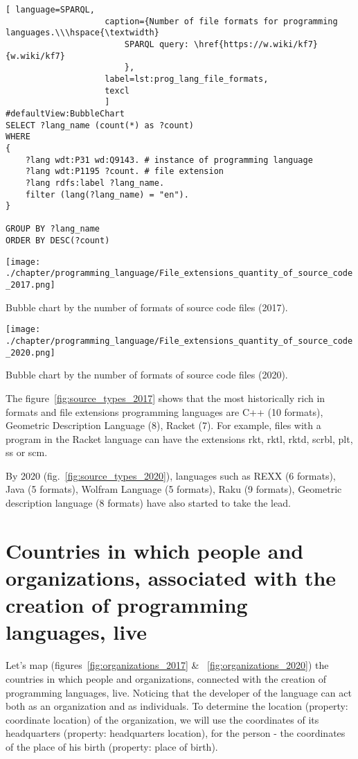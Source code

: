 \begin{lstlisting}[ language=SPARQL, 
                    caption={Number of file formats for programming languages.\\\hspace{\textwidth}
                        SPARQL query: \href{https://w.wiki/kf7}{w.wiki/kf7}
                        },
                    label=lst:prog_lang_file_formats,
                    texcl 
                    ]
#defaultView:BubbleChart
SELECT ?lang_name (count(*) as ?count)
WHERE
{
    ?lang wdt:P31 wd:Q9143. # instance of programming language
  	?lang wdt:P1195 ?count. # file extension
  	?lang rdfs:label ?lang_name.
    filter (lang(?lang_name) = "en").
}

GROUP BY ?lang_name 
ORDER BY DESC(?count)
\end{lstlisting}%

\begin{marginfigure}[-15cm]
	\texttt{[image: ./chapter/programming\_language/File\_extensions\_quantity\_of\_source\_code\_2017.png]}
	\caption{Bubble chart by the number of formats of source code files (2017).}
	\label{fig:source_types_2017}
\end{marginfigure}
\begin{marginfigure}[-3cm]
	\texttt{[image: ./chapter/programming\_language/File\_extensions\_quantity\_of\_source\_code\_2020.png]}
	\caption{Bubble chart by the number of formats of source code files (2020).}
	\label{fig:source_types_2020}
\end{marginfigure}

The figure~\ref{fig:source_types_2017} shows that the most historically rich in formats and file extensions programming languages are C++ (10 formats), Geometric Description Language (8), Racket (7). For example, files with a program in the Racket language can have the extensions rkt, rktl, rktd, scrbl, plt, ss or scm.

By 2020 (fig.~\ref{fig:source_types_2020}), languages such as REXX (6 formats), Java (5 formats), Wolfram Language (5 formats), Raku (9 formats), Geometric description language (8 formats) have also started to take the lead.

\section{Countries in which people and organizations, associated with the creation of programming languages, live}

Let's map (figures~\ref{fig:organizations_2017} \& ~\ref{fig:organizations_2020}) the countries in which people and organizations, connected with the creation of programming languages, live. Noticing that the developer of the language can act both as an organization and as individuals. To determine the location (property: coordinate location) of the organization, we will use the coordinates of its headquarters (property: headquarters location), for the person - the coordinates of the place of his birth (property: place of birth).

